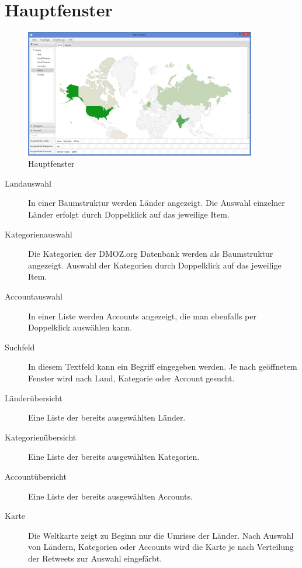 
\section{Hauptfenster}

\begin{figure}[h]
	\centering
	\includegraphics[width=0.9\textwidth]{img/DemoGUIMain.png}
	\caption{Hauptfenster}
	\label{c:Hauptfenster}
\end{figure}

\begin{description}
	\item[Landauswahl] In einer Baumstruktur werden Länder angezeigt. Die Auswahl einzelner Länder erfolgt durch Doppelklick auf das jeweilige Item.
	\item[Kategorienauswahl] Die Kategorien der DMOZ.org Datenbank werden als Baumstruktur angezeigt. Auswahl der Kategorien durch Doppelklick auf das jeweilige Item.
	\item[Accountauswahl] In einer Liste werden Accounts angezeigt, die man ebenfalls per Doppelklick auswählen kann.
	\item[Suchfeld] In diesem Textfeld kann ein Begriff eingegeben werden. Je nach geöffnetem Fenster wird nach Land, Kategorie oder Account gesucht.
	\item[Länderübersicht] Eine Liste der bereits ausgewählten Länder.
	\item[Kategorienübersicht] Eine Liste der bereits ausgewählten Kategorien.
	\item[Accountübersicht] Eine Liste der bereits ausgewählten Accounts.
	\item[Karte] Die Weltkarte zeigt zu Beginn nur die Umrisse der Länder. Nach Auswahl von Ländern, Kategorien oder Accounts wird die Karte je nach Verteilung der Retweets zur Auswahl eingefärbt.	
\end{description}

